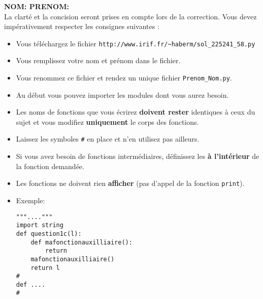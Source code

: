 \documentclass[10pt]{article}
\begin{document}
\vspace*{-1cm}

\noindent
{\bf NOM: \hspace*{5cm} PRENOM:}\\
\noindent
La clarté et la concision seront prises en compte lors de la correction.
Vous devez impérativement respecter les consignes suivantes :
\begin{itemize}
\item Vous téléchargez le fichier \verb+http://www.irif.fr/~haberm/sol_225241_58.py+
        \item Vous remplissez votre nom et prénom dans le fichier.
	\item Vous renommez ce fichier et rendez un unique fichier
              {\tt Prenom\_Nom.py}. 
        \item Au début vous pouvez importer les modules dont vous aurez besoin.
	\item Les noms de fonctions que vous écrirez {\bf doivent rester}
	  identiques à ceux du sujet et vous modifiez {\bf uniquement}
          le corps des fonctions.
          \item Laissez les symboles \verb+#+ en place
          et n'en utilisez pas ailleurs.
        \item Si vous avez besoin de fonctions intermédiaires, définissez les
{\bf à l'intérieur} de la fonction demandée.
        \item Les fonctions ne doivent rien {\bf afficher} (pas d'appel de la fonction \verb+print+).
\item Exemple:
\begin{verbatim}
"""...."""
import string
def question1c(l):
    def mafonctionauxilliaire(): 
        return
    mafonctionauxilliaire() 
    return l
#
def ....
#
\end{verbatim}
\end{itemize}
\end{document}
